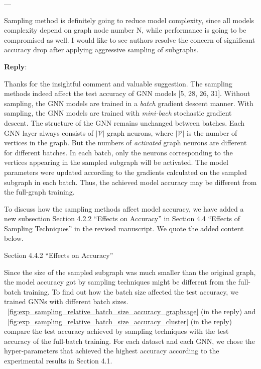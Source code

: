 \documentclass[12pt]{article}
\newenvironment{myquote}[1]%
{\vspace{0.5em}\begin{zitat}{#1}}
{\end{zitat}\vspace{0.5em}}
\newcounter{reviewer}
\newcounter{point}[reviewer]
\renewcommand{\thepoint}{P\,\thereviewer.\arabic{point}}
\newenvironment{point}
   {\refstepcounter{point} \bigskip \noindent {\textbf{Reviewer~Point~\thepoint} } ---\ \begin{sf}}
   {\end{sf} \par}
\newenvironment{reply}
   {\medskip \noindent \textbf{Reply}:\  }
   {\medskip}
\begin{document}
\begin{point}
    Sampling method is definitely going to reduce model complexity, since all models complexity depend on graph node number N, while performance is going to be compromised as well. I would like to see authors resolve the concern of significant accuracy drop after applying aggressive sampling of subgraphs.
\end{point}

\begin{reply}

    Thanks for the insightful comment and valuable suggestion.
    The sampling methods indeed affect the test accuracy of GNN models [5, 28, 26, 31].%
    Without sampling, the GNN models are trained in a \emph{batch} gradient descent manner.
    With sampling, the GNN models are trained with \emph{mini-bach} stochastic gradient descent.
    The structure of the GNN remains unchanged between batches.
    Each GNN layer always consists of $|\mathcal{V}|$ graph neurons, where $|\mathcal{V}|$ is the number of vertices in the graph.
    But the numbers of \emph{activated} graph neurons are different for different batches.
    In each batch, only the neurons corresponding to the vertices appearing in the sampled subgraph will be activated.
    The model parameters were updated according to the gradients calculated on the sampled subgraph in each batch.
    Thus, the achieved model accuracy may be different from the full-graph training.
    
    To discuss how the sampling methods affect model accuracy, we have added a new subsection Section 4.2.2 ``Effects on Accuracy'' in Section 4.4 ``Effects of Sampling Techniques'' in the revised manuscript.
    We quote the added content below.
    
    \begin{myquote}{Section 4.4.2 ``Effects on Accuracy''}
    
    Since the size of the sampled subgraph was much smaller than the original graph, the model accuracy got by sampling techniques might be different from the full-batch training.
    To find out how the batch size affected the test accuracy, we trained GNNs with different batch sizes.
    \figurename~\ref{fig:exp_sampling_relative_batch_size_accuracy_graphsage} (in the reply) and \figurename~\ref{fig:exp_sampling_relative_batch_size_accuracy_cluster} (in the reply) compare the test accuracy achieved by sampling techniques with the test accuracy of the full-batch training.
    For each dataset and each GNN, we chose the hyper-parameters that achieved the highest accuracy according to the experimental results in Section 4.1.
    

\end{myquote}
\end{reply}
\end{document}
